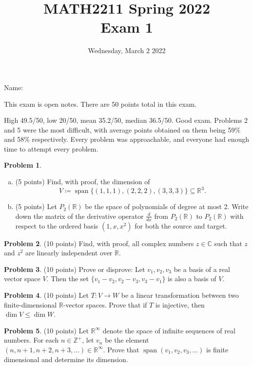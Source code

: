 \documentclass[11pt,oneside]{amsart}
\title{MATH2211 Spring 2022\\
Exam 1}
\author{Wednesday, March 2 2022}
\theoremstyle{definition}
\newtheorem{problem}{Problem}
\newcommand{\bC}{\mathbb{C}}
\newcommand{\bR}{\mathbb{R}}
\newcommand{\bZ}{\mathbb{Z}}
\DeclareMathOperator{\Span}{span}
\begin{document}
    \maketitle

    Name: \underline{\hspace{6cm}}

    This exam is open notes. There are 50 points total in this exam.

    {\color{maroon}
        High 49.5/50, low 20/50, mean 35.2/50, median 36.5/50. Good exam. Problems 2 and 5 were the most difficult, with average points obtained on them being 59\% and 58\% respectively. Every problem was approachable, and everyone had enough time to attempt every problem.
    }

    \begin{problem}
        \leavevmode\begin{enumerate}[(a)]
            \item (5 points) Find, with proof, the dimension of
            \[V\coloneqq\Span\{(1,1,1), (2,2,2), (3,3,3)\}\subseteq\bR^3.\]
            \vfill
            \item (5 points) Let $P_2(\bR)$ be the space of polynomials of degree at most 2. Write down the matrix of the derivative operator $\frac {d}{dx}$ from $P_2(\bR)$ to $P_2(\bR)$ with respect to the ordered basis $(1,x,x^2)$ for both the source and target.
            \vfill
        \end{enumerate}
    \end{problem}
    

    \begin{problem}
        (10 points) Find, with proof, all complex numbers $z\in\bC$ such that $z$ and $z^2$ are linearly independent over $\bR$.
    \end{problem}
    \vfill

    \begin{problem}
        (10 points) Prove or disprove: Let $v_1,v_2,v_3$ be a basis of a real vector space $V$. Then the set $\{v_1-v_2,v_2-v_3,v_3-v_1\}$ is also a basis of $V$.
    \end{problem}
    \vfill
    

    \begin{problem}
        (10 points) Let $T\colon V\to W$ be a linear transformation between two finite-dimensional $\bR$-vector spaces. Prove that if $T$ is injective, then $\dim V\leq\dim W$.
    \end{problem}
    \vfill

    \begin{problem}
        (10 points) Let $\bR^\infty$ denote the space of infinite sequences of real numbers. For each $n\in\bZ^+$, let $v_n$ be the element $(n,n+1,n+2,n+3,\dots)\in\bR^\infty$. Prove that $\Span(v_1,v_2,v_3,\dots)$ is finite dimensional and determine its dimension.
    \end{problem}
    \vfill
\end{document}

